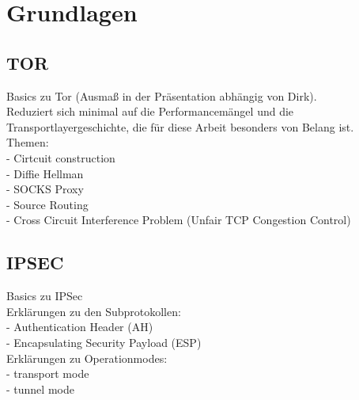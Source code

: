 \section{Grundlagen}

\subsection{TOR}

Basics zu Tor (Ausmaß in der Präsentation abhängig von Dirk).\\
Reduziert sich minimal auf die Performancemängel und die Transportlayergeschichte, die für diese Arbeit besonders von Belang ist. \\
Themen:\\
- Cirtcuit construction\\
- Diffie Hellman\\
- SOCKS Proxy\\
- Source Routing\\
- Cross Circuit Interference Problem (Unfair TCP Congestion Control)\\

\subsection{IPSEC}

Basics zu IPSec\\
Erklärungen zu den Subprotokollen:\\
- Authentication Header (AH)\\
- Encapsulating Security Payload (ESP)\\
Erklärungen zu Operationmodes:\\
- transport mode\\
- tunnel mode\\